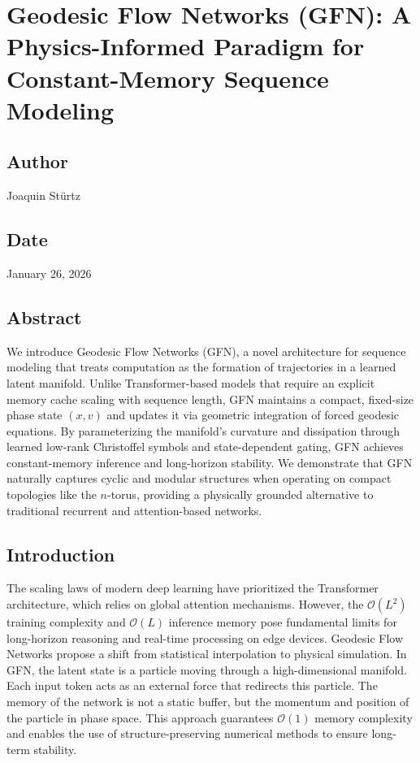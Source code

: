 \documentclass{article}
\numberwithin{equation}{section}
\begin{document}
\section{Geodesic Flow Networks (GFN): A Physics-Informed Paradigm for Constant-Memory Sequence Modeling}
\subsection*{Author}
Joaquin Stürtz
\subsection*{Date}
January 26, 2026
\subsection*{Abstract}
We introduce Geodesic Flow Networks (GFN), a novel architecture for sequence modeling that treats computation as the formation of trajectories in a learned latent manifold. Unlike Transformer-based models that require an explicit memory cache scaling with sequence length, GFN maintains a compact, fixed-size phase state $(x, v)$ and updates it via geometric integration of forced geodesic equations. By parameterizing the manifold's curvature and dissipation through learned low-rank Christoffel symbols and state-dependent gating, GFN achieves constant-memory inference and long-horizon stability. We demonstrate that GFN naturally captures cyclic and modular structures when operating on compact topologies like the $n$-torus, providing a physically grounded alternative to traditional recurrent and attention-based networks.

\subsection{Introduction}
The scaling laws of modern deep learning have prioritized the Transformer architecture, which relies on global attention mechanisms. However, the $\mathcal{O}(L^2)$ training complexity and $\mathcal{O}(L)$ inference memory pose fundamental limits for long-horizon reasoning and real-time processing on edge devices.
Geodesic Flow Networks propose a shift from statistical interpolation to physical simulation. In GFN, the latent state is a particle moving through a high-dimensional manifold. Each input token acts as an external force that redirects this particle. The memory of the network is not a static buffer, but the momentum and position of the particle in phase space. This approach guarantees $\mathcal{O}(1)$ memory complexity and enables the use of structure-preserving numerical methods to ensure long-term stability.
\end{document}
